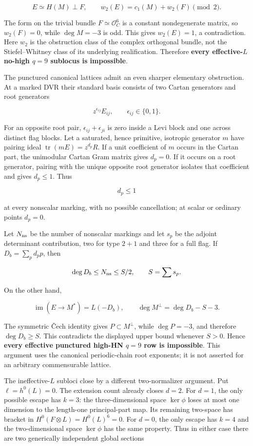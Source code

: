 \documentclass[11pt]{article}
\theoremstyle{definition}
\begin{document}
\[E\simeq H(M)\perp F,
\qquad
w_2(E)=c_1(M)+w_2(F)\pmod2.\]

The form on the trivial bundle \(F\simeq\mathcal O_C^6\) is a constant
nondegenerate matrix, so \(w_2(F)=0\), while \(\deg M=-3\) is odd. This
gives \(w_2(E)=1\), a contradiction. Here \(w_2\) is the obstruction
class of the complex orthogonal bundle, not the Stiefel--Whitney class
of its underlying realification. Therefore \textbf{every effective-\(L\)
no-high \(q=9\) sublocus is impossible}.

The punctured canonical lattices admit an even sharper elementary
obstruction. At a marked DVR their standard basis consists of two Cartan
generators and root generators

\[z^{\epsilon_{ij}}E_{ij},
\qquad \epsilon_{ij}\in\{0,1\}.\]

For an opposite root pair, \(\epsilon_{ij}+\epsilon_{ji}\) is zero
inside a Levi block and one across distinct flag blocks. Let a
saturated, hence primitive, isotropic generator \(m\) have pairing ideal
\(\operatorname{tr}(mE)=z^{d_p}R\). If a unit coefficient of \(m\)
occurs in the Cartan part, the unimodular Cartan Gram matrix gives
\(d_p=0\). If it occurs on a root generator, pairing with the unique
opposite root generator isolates that coefficient and gives \(d_p\le1\).
Thus

\[d_p\le1\]

at every nonscalar marking, with no possible cancellation; at scalar or
ordinary points \(d_p=0\).

Let \(N_{\rm ns}\) be the number of nonscalar markings and let \(s_p\)
be the adjoint determinant contribution, two for type \(2+1\) and three
for a full flag. If \(D_b=\sum_p d_p p\), then

\[\deg D_b\le N_{\rm ns}\le S/2,
\qquad S=\sum s_p.\]

On the other hand,

\[\operatorname{im}(E\longrightarrow M^*)=L(-D_b),
\qquad
\deg M^\perp=\deg D_b-S-3.\]

The symmetric \v{C}ech identity gives \(P\subset M^\perp\), while
\(\deg P=-3\), and therefore \(\deg D_b\ge S\). This contradicts the
displayed upper bound whenever \(S>0\). Hence \textbf{every effective
punctured high-HN \(q=9\) row is impossible}. This argument uses the
canonical periodic-chain root exponents; it is not asserted for an
arbitrary commensurable lattice.

The ineffective-\(L\) subloci close by a different two-normalizer
argument. Put \(\ell=h^0(L)=0\). The extension count already closes
\(d=2\). For \(d=1\), the only possible escape has \(k=3\): the
three-dimensional space \(\ker\phi\) loses at most one dimension to the
length-one principal-part map. Its remaining two-space has bracket in
\(H^0(F\otimes L)=H^0(L)^6=0\). For \(d=0\), the only escape has \(k=4\)
and the two-dimensional space \(\ker\phi\) has the same property. Thus
in either case there are two generically independent global sections
\end{document}
